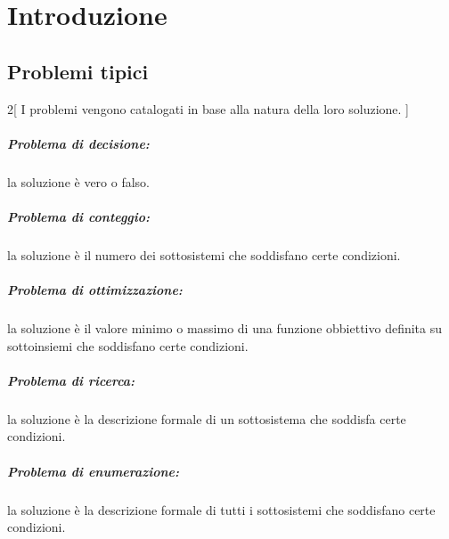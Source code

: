 \documentclass[\main/main.tex]{subfiles}
\begin{document}
\chapter{Introduzione}
\section{Problemi tipici}
\begin{multicols}{2}[
    I problemi vengono catalogati in base alla natura della loro soluzione.
  ]
  \paragraph*{Problema di decisione:} la soluzione è vero o falso.
  \paragraph*{Problema di conteggio:} la soluzione è il numero dei sottosistemi che soddisfano certe condizioni.
  \paragraph*{Problema di ottimizzazione:} la soluzione è il valore minimo o massimo di una funzione obbiettivo definita su sottoinsiemi che soddisfano certe condizioni.
  \paragraph*{Problema di ricerca:} la soluzione è la descrizione formale di un sottosistema che soddisfa certe condizioni.
  \paragraph*{Problema di enumerazione:} la soluzione è la descrizione formale di tutti i sottosistemi che soddisfano certe condizioni.
\end{multicols}
\end{document}
